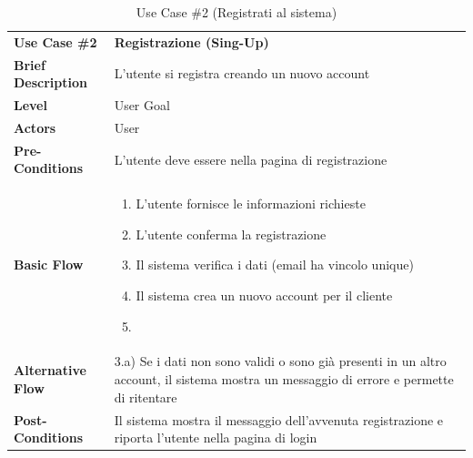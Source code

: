 \documentclass[a4paper, 11pt]{article}
\begin{document}
	\vspace{1cm}

	\begin{table}[h]
		\centering
		\setlength{\arrayrulewidth}{0.8pt} %

		\begin{tabular}{|l p{12cm}|}
			\hline

			\rowcolor{gray!25}
			\textbf{Use Case \#2} & \textbf{Registrazione (Sing-Up)} \\
			\textbf{Brief Description} & L'utente si registra creando un nuovo account \\
			\textbf{Level} & User Goal \\
			\textbf{Actors} & User \\
			\textbf{Pre-Conditions} & L'utente deve essere nella pagina di registrazione \\ %
			\textbf{Basic Flow} & \begin{enumerate}[label=\arabic*), leftmargin=*, before=\vspace{-0.7cm}, after=\vspace{-0.4cm}]
									  \item L'utente  fornisce le informazioni richieste
									  \item L'utente conferma la registrazione
									  \item Il sistema verifica i dati (email ha vincolo unique)
									  \item Il sistema crea un nuovo account per il cliente
									  \item[]
			\end{enumerate} \\
			\textbf{Alternative Flow} & 3.a) Se i dati non sono validi o sono già presenti in un altro account, il sistema mostra un messaggio di errore e permette di ritentare\\
			\textbf{Post-Conditions} & Il sistema mostra il messaggio dell'avvenuta registrazione e riporta l'utente nella pagina di login \\

			\hline
		\end{tabular}

		\vspace{0.2cm}
		\caption{Use Case \#2 (Registrati al sistema)}
	\end{table}

	\vspace{1cm}
\end{document}
